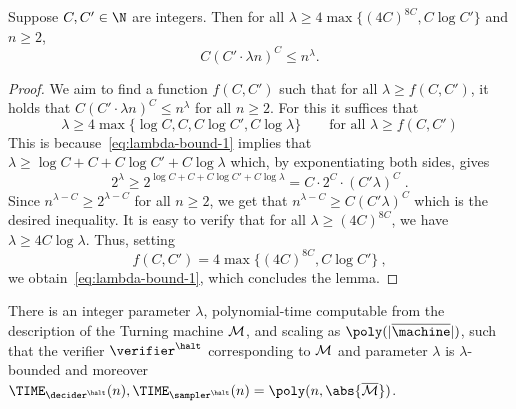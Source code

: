 \begin{lemma}
  \label{lem:lambda-bound}
  Suppose $C, C' \in \N$ are integers. 
  Then for all $\lambda \ge 4 \max \{ (4C)^{8C}, C \log C' \} $ and $n \ge 2$,
  \begin{equation*}
    C(C' \cdot \lambda n)^C \le n^\lambda.
  \end{equation*}
\end{lemma}

\begin{proof}
We aim to find a function $f(C,C')$ such that for all $\lambda \geq f(C,C')$, it holds that $C(C' \cdot \lambda n)^C \le n^\lambda$ for all $n \geq 2$. For this it suffices that 
\begin{equation}
\label{eq:lambda-bound-1}
	\lambda \geq 4 \max \{ \log C, C, C \log C', C \log \lambda \} \qquad \text{for all $\lambda \geq f(C,C')$}
\end{equation}
This is because~\eqref{eq:lambda-bound-1} implies that $\lambda \geq \log C + C + C\log C' + C\log \lambda$ which, by exponentiating both sides, gives
\[
	2^\lambda \geq 2^{\log C + C + C\log C' + C\log \lambda} = C \cdot 2^C \cdot (C' \lambda)^C\;.
\]
Since $n^{\lambda - C} \geq 2^{\lambda -C}$ for all $n \geq 2$, we get that $n^{\lambda - C} \geq C (C' \lambda)^C$ which is the desired inequality. It is easy to verify that for all $\lambda \geq (4C)^{8C}$, we have $\lambda \geq 4 C \log \lambda$. Thus, setting
\[
	f(C,C') = 4 \max \{ (4C)^{8C}, C \log C' \}~,
\]
we obtain~\eqref{eq:lambda-bound-1}, which concludes the lemma.
\end{proof}

\begin{lemma}
  \label{lem:lambda}
  There is an integer parameter $\lambda$, polynomial-time computable from the
  description of the Turning machine $\cal{M}$, and
  scaling as $\poly(|\overline{\machine}|)$, such that the verifier
  $\verifier^\halt$ corresponding to $\cal{M}$ and parameter $\lambda$ is
  $\lambda$-bounded and moreover $\TIME_{\decider^\halt}(n),\TIME_{\sampler^\halt}(n) = \poly(n, \abs{\overline{\cal{M}}})$.
\end{lemma}

